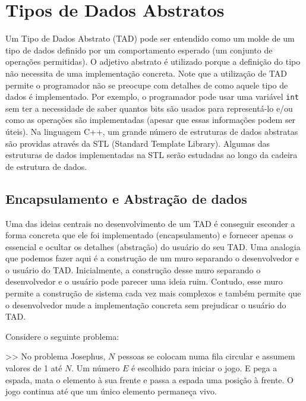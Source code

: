 
\chapter{Tipos de Dados Abstratos}

Um Tipo de Dados Abstrato (TAD) pode ser entendido como um molde de um tipo de dados definido por um comportamento esperado (um conjunto de operações permitidas). O adjetivo abstrato é utilizado porque a definição do tipo não necessita de uma implementação concreta. Note que a utilização de TAD permite o programador não se preocupe com detalhes de como aquele tipo de dados é implementado. Por exemplo, o programador pode usar uma variável \texttt{int} sem ter a necessidade de saber quantos bits são usados para representá-lo e/ou como as operações são implementadas (apesar que essas informações podem ser úteis). Na linguagem C++, um grande número de estruturas de dados abstratas são providas através da STL (Standard Template Library). Algumas das estruturas de dados implementadas na STL serão estudadas ao longo da cadeira de estrutura de dados.

\section{Encapsulamento e Abstração de dados}

Uma das ideias centrais no desenvolvimento de um TAD é conseguir esconder  a forma concreta que ele foi implementado (encapsulamento) e fornecer apenas o essencial e ocultar os detalhes (abstração) do usuário do seu TAD. Uma analogia que podemos fazer aqui é a construção de um muro separando o desenvolvedor e o usuário do TAD. Inicialmente, a construção desse muro separando o desenvolvedor e o usuário pode parecer uma ideia ruim. Contudo, esse muro permite a construção de sistema cada vez mais complexos e também permite que o desenvolvedor mude a implementação concreta sem prejudicar o usuário do TAD.

Considere o seguinte problema:

\begin{markdown}

>> No problema Josephus, $N$ pessoas se colocam numa fila circular e assumem valores de 1 até $N$. Um número $E$ é escolhido para iniciar o jogo. E pega a espada, mata o elemento à sua frente e passa a espada uma posição à frente. O jogo continua até que um único elemento permaneça vivo.
\end{markdown}

